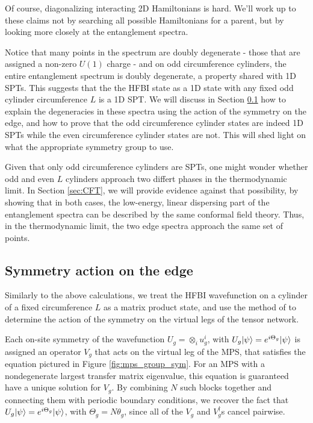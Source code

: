 Of course, diagonalizing interacting 2D Hamiltonians is hard. We'll work up to 
these claims not by searching all possible Hamiltonians for a parent, but by 
looking more closely at the entanglement spectra.

Notice that many points in the spectrum are doubly degenerate - those that are 
assigned a non-zero $U(1)$ charge - and on odd circumference cylinders, the 
entire entanglement spectrum is doubly degenerate, a property shared with 1D 
SPTs. This suggests that the the HFBI state as a 1D state with any  
fixed odd cylinder circumference $L$ is a 1D SPT. We will discuss in
Section \ref{sec:symmetry} how to explain the degeneracies in these spectra 
using the action of the symmetry on the edge, and how to prove that the odd 
circumference cylinder states are indeed 1D SPTs while the even circumference 
cylinder states are not. This will shed light on what the appropriate symmetry group to use.

Given that only odd circumference cylinders are SPTs, one might wonder whether 
odd and even $L$ cylinders approach two differt phases in the thermodynamic 
limit. In Section \ref{sec:CFT}, we will provide evidence against that 
possibility, by showing that in both cases, the low-energy, linear dispersing 
part of the entanglement spectra can be described by the same conformal field 
theory. Thus, in the thermodynamic limit, the two edge spectra approach the 
same set of points.
	
\subsection{Symmetry action on the edge}
\label{sec:symmetry}

Similarly to the above calculations, we treat the HFBI wavefunction on a 
cylinder of a fixed circumference $L$ as a matrix product state, and use the 
method of  to determine the action of the symmetry on 
the virtual legs of the tensor network.

Each on-site symmetry of the wavefunction $U_g = \otimes_i u^i_g$, with $U_g 
\vert \psi \rangle = e^{i \Theta_g} \vert \psi \rangle$ is assigned an operator $V_g$ that 
acts on the virtual leg of the MPS, that satisfies the equation pictured in 
Figure \ref{fig:mps_group_sym}. For an MPS with a nondegenerate largest 
transfer matrix eigenvalue, this equation is guaranteed have a unique solution 
for $V_g$. By combining $N$ such blocks together and connecting them with 
periodic boundary conditions, we recover the fact that $U_g 
\vert \psi \rangle = e^{i \Theta_g} \vert \psi \rangle$, with $\Theta_g = N \theta_g$, since 
all of the $V_g$ and $V_g^{\dagger}$s cancel pairwise.      


